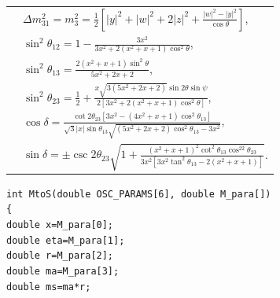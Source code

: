 \documentclass[aps,prd,nofootinbib,preprint]{revtex4}
\begin{document}
\begin{table}[h!]
\begin{tabular}{l|l}
                                                 & $\Delta m_{31}^2=m^2_3=\frac{1}{2}\left[\left|y\right|^2+\left|w\right|^2+2\left|z\right|^2+\frac{\left|w\right|^2-\left|y\right|^2}{\cos\theta}\right]$,                                        \\
                                                 & $\sin^2\theta_{12}=1-\frac{3x^2 }{3x^2+2\left(x^2+x+1\right) \cos^2\theta }$,                                                                                                                  \\
                                                                                                  & $\sin^2\theta_{13}=\frac{2\left(x^2+x+1\right)\sin^2\theta}{5x^2+2x+2}$,                                                                                                                       \\
                                                 & $\sin^2\theta_{23}=\frac{1}{2}+\frac{x\sqrt{3\left(5x^2+2x+2\right)}\sin2\theta\sin\psi }{2\left[3x^2+2\left(x^2+x+1\right) \cos^ 2 \theta\right]}$,                                          \\
                                                 & $\cos\delta=\frac{ \cot 2 \theta_{23} \left[3x^2-\left(4x^2+ x+1\right)\cos^2\theta_{13}\right]}{\sqrt{3} \left|x\right| \sin \theta_{13} \sqrt{\left(5x^2+2x+2\right)\cos^2\theta_{13}-3x^2}}$, \\
                                                 & $\sin\delta= \pm\csc 2 \theta_{23} \sqrt{1+\frac{\left(x^2+x+1\right)^2 \cot ^2\theta_{13} \cos ^22 \theta_{23}}{3x^2 \left[3x^2 \tan ^2\theta_{13}-2 \left(x^2+x+1\right)\right]}}$.   \\\hline \hline       
\end{tabular}
\end{table}




\texttt{int MtoS(double OSC\_PARAMS[6],~double M\_para[])}\\
\texttt{\{}
\\        
   \texttt{double x=M\_para[0];}\\
    \texttt{double eta=M\_para[1];}\\
    \texttt{double r=M\_para[2];}\\
    \texttt{double ma=M\_para[3];}\\
    \texttt{double ms=ma*r;}\\
    
\end{document}
